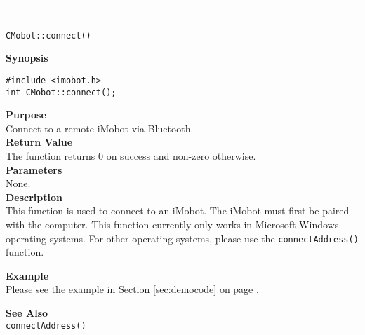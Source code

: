 \noindent
\vspace{5pt}
\rule{4.5in}{0.015in}\\
\noindent
{\LARGE \texttt{CMobot::connect()}}\\
{}

\noindent
{\bf Synopsis}\\
\begin{verbatim}
#include <imobot.h>
int CMobot::connect();
\end{verbatim}

\noindent
{\bf Purpose}\\
Connect to a remote iMobot via Bluetooth.\\

\noindent
{\bf Return Value}\\
The function returns 0 on success and non-zero otherwise.\\

\noindent
{\bf Parameters}\\
None.\\

\noindent
{\bf Description}\\
This function is used to connect to an iMobot. The iMobot must first be paired
with the computer. This function currently only works in Microsoft Windows
operating systems. For other operating systems, please use the
\texttt{connectAddress()} function.

\noindent
{\bf Example}\\
Please see the example in Section \ref{sec:democode} on page \pageref{sec:democode}.\\
\noindent

\noindent
{\bf See Also}\\
\texttt{connectAddress()}

